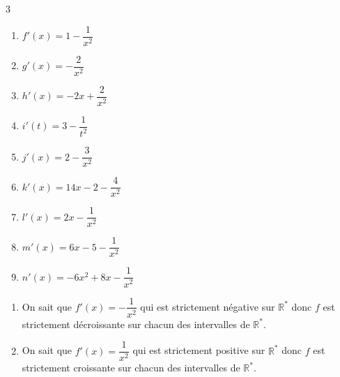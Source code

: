 \documentclass[french]{book}
\begin{document}
\begin{corrige}
\begin{multicols}{3}
\begin{enumerate}
\item $f'(x)= 1-\dfrac{1}{x^2}$
\item $g'(x)=-\dfrac{2}{x^2}$
\item $h'(x)=-2x+\dfrac{2}{x^2}$
\item $i'(t)=3-\dfrac{1}{t^2}$
\item $j'(x)=2-\dfrac{3}{x^2}$
\item $k'(x)=14x-2-\dfrac{4}{x^2}$
\item $l'(x)=2x-\dfrac{1}{x^2}$
\item $m'(x)=6x-5-\dfrac{1}{x^2}$
\item $n'(x)=-6x^2+8x-\dfrac{1}{x^2}$
\end{enumerate}
\end{multicols}
\end{corrige}

\begin{corrige}
\begin{enumerate}
\item On sait que $f'(x)=-\dfrac{1}{x^2}$ qui est strictement négative sur $\mathbb{R}^*$ donc $f$ est strictement décroissante sur chacun des intervalles de $\mathbb{R}^*$.

\begin{center}
\end{center}

\item  On sait que $f'(x)=\dfrac{1}{x^2}$ qui est strictement positive sur $\mathbb{R}^*$ donc $f$ est strictement croissante sur chacun des intervalles de $\mathbb{R}^*$.

\begin{center}
\end{center}
\end{enumerate}
\end{corrige}
\end{document}
